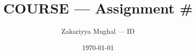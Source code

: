 
\title{\small COURSE --- Assignment \#} %
\author{\small Zakariyya Mughal --- ID} %
\date{\small \today}                    %

\maketitle





